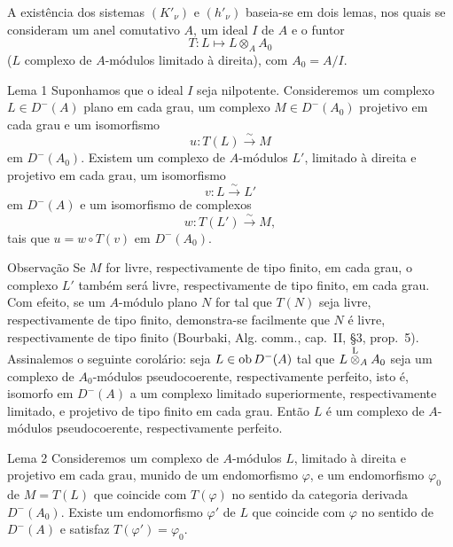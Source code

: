 A existência dos sistemas $(K'_\nu)$ e $(h'_\nu)$ baseia-se em dois lemas, nos quais se consideram um anel comutativo $A$, um ideal $I$ de $A$ e o funtor
\[
T:L\longmapsto L\otimes_A A_0
\]
($L$ complexo de $A$-módulos limitado à direita), com $A_0=A/I$.

\begin{statement}{Lema 1}
Suponhamos que o ideal $I$ seja nilpotente. Consideremos um complexo $L\in D^-(A)$ plano em cada grau, um complexo $M\in D^-(A_0)$ projetivo em cada grau e um isomorfismo
\[
u:T(L)\xrightarrow{\sim}M
\]
em $D^-(A_0)$. Existem um complexo de $A$-módulos $L'$, limitado à direita e projetivo em cada grau, um isomorfismo
\[
v:L\xrightarrow{\sim}L'
\]
em $D^-(A)$ e um isomorfismo de complexos
\[
w:T(L')\xrightarrow{\sim}M,
\]
tais que $u=w\circ T(v)$ em $D^-(A_0)$.
\end{statement}

\begin{statement}{Observação}
Se $M$ for livre, respectivamente de tipo finito, em cada grau, o complexo $L'$ também será livre, respectivamente de tipo finito, em cada grau. Com efeito, se um $A$-módulo plano $N$ for tal que $T(N)$ seja livre, respectivamente de tipo finito, demonstra-se facilmente que $N$ é livre, respectivamente de tipo finito (Bourbaki, Alg. comm., cap.~II, §3, prop.~5). Assinalemos o seguinte corolário: seja $L\in\operatorname{ob} D^-(A)$ tal que $L\overset{\mathrm L}{\otimes}_A A_0$ seja um complexo de $A_0$-módulos pseudocoerente, respectivamente perfeito, isto é, isomorfo em $D^-(A)$ a um complexo limitado superiormente, respectivamente limitado, e projetivo de tipo finito em cada grau. Então $L$ é um complexo de $A$-módulos pseudocoerente, respectivamente perfeito.
\end{statement}

\begin{statement}{Lema 2}
Consideremos um complexo de $A$-módulos $L$, limitado à direita e projetivo em cada grau, munido de um endomorfismo $\varphi$, e um endomorfismo $\varphi_0$ de $M=T(L)$ que coincide com $T(\varphi)$ no sentido da categoria derivada $D^-(A_0)$. Existe um endomorfismo $\varphi'$ de $L$ que coincide com $\varphi$ no sentido de $D^-(A)$ e satisfaz $T(\varphi')=\varphi_0$.
\end{statement}

